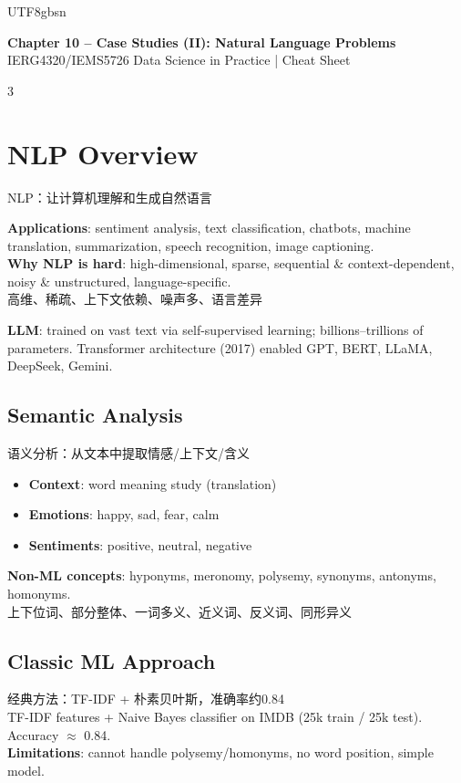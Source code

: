 \documentclass[9pt,landscape,a4paper]{article}
\newcommand{\zhint}[1]{{\scriptsize\color{gray!70!black}#1}}
\begin{document}
\begin{CJK}{UTF8}{gbsn}

\begin{center}
{\large\bfseries\color{blue!70!black} Chapter 10 -- Case Studies (II): Natural Language Problems}\\
{\footnotesize IERG4320/IEMS5726 Data Science in Practice | Cheat Sheet}
\end{center}

\begin{multicols}{3}

\section{NLP Overview}
\zhint{NLP：让计算机理解和生成自然语言}

\textbf{Applications}: sentiment analysis, text classification, chatbots, machine translation, summarization, speech recognition, image captioning.\\
\textbf{Why NLP is hard}: high-dimensional, sparse, sequential \& context-dependent, noisy \& unstructured, language-specific.\\
\zhint{高维、稀疏、上下文依赖、噪声多、语言差异}

\textbf{LLM}: trained on vast text via self-supervised learning; billions--trillions of parameters. Transformer architecture (2017) enabled GPT, BERT, LLaMA, DeepSeek, Gemini.

\subsection{Semantic Analysis}
\zhint{语义分析：从文本中提取情感/上下文/含义}
\begin{itemize}[leftmargin=8pt,itemsep=0pt,topsep=0pt]
\item \textbf{Context}: word meaning study (translation)
\item \textbf{Emotions}: happy, sad, fear, calm
\item \textbf{Sentiments}: positive, neutral, negative
\end{itemize}

\textbf{Non-ML concepts}: hyponyms, meronomy, polysemy, synonyms, antonyms, homonyms.\\
\zhint{上下位词、部分整体、一词多义、近义词、反义词、同形异义}

\subsection{Classic ML Approach}
\zhint{经典方法：TF-IDF + 朴素贝叶斯，准确率约0.84}\\
TF-IDF features + Naive Bayes classifier on IMDB (25k train / 25k test). Accuracy $\approx$ 0.84.\\
\textbf{Limitations}: cannot handle polysemy/homonyms, no word position, simple model.


\end{multicols}
\end{CJK}
\end{document}
